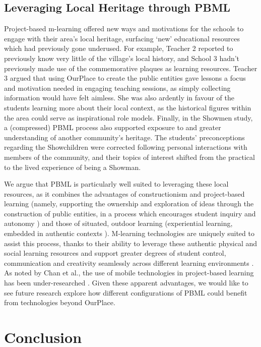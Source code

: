 \documentclass[,hyphens]{sigchi}
\begin{document}
\subsection{Leveraging Local Heritage through PBML}
Project-based m-learning offered new ways and motivations for the schools to engage with their area's local heritage, surfacing `new' educational resources which had previously gone underused. For example, Teacher 2 reported to previously know very little of the village's local history, and School 3 hadn't previously made use of the commemorative plaques as learning resources. Teacher 3 argued that using OurPlace to create the public entities gave lessons a focus and motivation needed in engaging teaching sessions, as simply collecting information would have felt aimless. She was also ardently in favour of the students learning more about their local context, as the historical figures within the area could serve as inspirational role models. Finally, in the Showmen study, a (compressed) PBML process also supported exposure to and greater understanding of another community's heritage. The students' preconceptions regarding the Showchildren were corrected following personal interactions with members of the community, and their topics of interest shifted from the practical to the lived experience of being a Showman.

We argue that PBML is particularly well suited to leveraging these local resources, as it combines the advantages of constructionism and project-based learning (namely, supporting the ownership and exploration of ideas through the construction of public entities, in a process which encourages student inquiry and autonomy \cite{Noss2017, Larmer2015}) and those of situated, outdoor learning (experiential learning, embedded in authentic contexts \cite{Lave1991}). M-learning technologies are uniquely suited to assist this process, thanks to their ability to leverage these authentic physical and social learning resources and support greater degrees of student control, communication and creativity seamlessly across different learning environments \cite{Sharples2007, Richardson2018}. As noted by Chan et al., the use of mobile technologies in project-based learning has been under-researched \cite{Chan2015}. Given these apparent advantages, we would like to see future research explore how different configurations of PBML could benefit from technologies beyond OurPlace.

\section{Conclusion}
\end{document}
